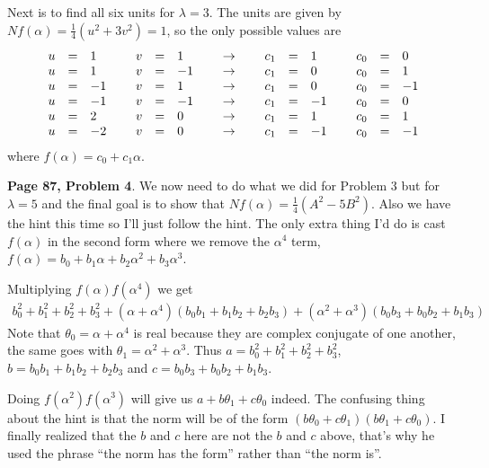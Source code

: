 \documentclass[aps,preprint,preprintnumbers,nofootinbib,showpacs,prd]{revtex4-1}
\newcommand{\nbea}{\begin{eqnarray*}}
\newcommand{\neea}{\end{eqnarray*}}
\begin{document}
Next is to find all six units for $\lambda = 3$. The units are given by $Nf(\alpha) = \frac{1}{4}(u^2 + 3v^2) = 1$, so the only possible values are
%
\nbea
\begin{array}{r c l c r c l c r c l c r c l}
u & = & 1 & ~ & v & = & 1 & ~~~~\to~~~~ & c_1 & = & 1 & ~ & c_0 & = & 0 \\
u & = & 1 & ~ & v & = & -1 & ~~~~\to~~~~ & c_1 & = & 0 & ~ & c_0 & = & 1 \\
u & = & -1 & ~ & v & = & 1 & ~~~~\to~~~~ & c_1 & = & 0 & ~ & c_0 & = & -1 \\
u & = & -1 & ~ & v & = & -1 & ~~~~\to~~~~ & c_1 & = & -1 & ~ & c_0 & = & 0 \\
u & = & 2 & ~ & v & = & 0 & ~~~~\to~~~~ & c_1 & = & 1 & ~ & c_0 & = & 1 \\
u & = & -2 & ~ & v & = & 0 & ~~~~\to~~~~ & c_1 & = & -1 & ~ & c_0 & = & -1
\end{array}
\neea
%
where $f(\alpha) = c_0 + c_1 \alpha$.

{\bf Page 87, Problem 4}. We now need to do what we did for Problem 3 but for $\lambda = 5$ and the final goal is to show that $Nf(\alpha) = \frac{1}{4}(A^2 - 5B^2)$. Also we have the hint this time so I'll just follow the hint. The only extra thing I'd do is cast $f(\alpha)$ in the second form where we remove the $\alpha^4$ term, $f(\alpha) = b_0 + b_1\alpha + b_2\alpha^2 + b_3\alpha^3$.

Multiplying $f(\alpha)f(\alpha^4)$ we get
%
\nbea
b_0^2 + b_1^2 + b_2^2 + b_3^2 + (\alpha + \alpha^4)(b_0b_1 + b_1b_2 + b_2b_3) + (\alpha^2 + \alpha^3)(b_0b_3 + b_0b_2 + b_1b_3)
\neea
%
Note that $\theta_0 = \alpha + \alpha^4$ is real because they are complex conjugate of one another, the same goes with $\theta_1 = \alpha^2 + \alpha^3$. Thus $a = b_0^2 + b_1^2 + b_2^2 + b_3^2$, $b = b_0b_1 + b_1b_2 + b_2b_3$ and $c = b_0b_3 + b_0b_2 + b_1b_3$.

Doing $f(\alpha^2)f(\alpha^3)$ will give us $a + b\theta_1 + c\theta_0$ indeed. The confusing thing about the hint is that the norm will be of the form $(b\theta_0 + c\theta_1)(b\theta_1 + c\theta_0)$. I finally realized that the $b$ and $c$ here are not the $b$ and $c$ above, that's why he used the phrase ``the norm has the form'' rather than ``the norm is''.
\end{document}
